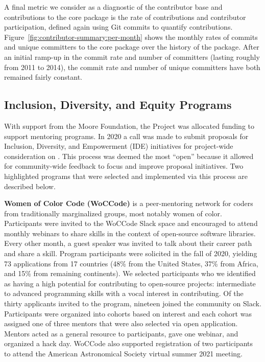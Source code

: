 \documentclass[modern]{aastex631}
\newcommand{\secauthor}[1]{{\color{blue}Author:~\textit{#1}}}
\begin{document}
A final metric we consider as a diagnostic of the contributor base and
contributions to the \astropypkg core package is the rate of contributions and
contributor participation, defined again using Git commits to quantify
contributions.
Figure~\ref{fig:contributor-summary:per-month} shows the monthly rates of
commits and unique committers to the \astropypkg core package over the history
of the package.
After an initial ramp-up in the commit rate and number of committers (lasting
roughly from 2011 to 2014), the commit rate and number of unique committers have
both remained fairly constant.


\subsection{Inclusion, Diversity, and Equity Programs} \label{sec:project-ide}


With support from the Moore Foundation, the \astropy Project was
allocated funding to support mentoring programs. In 2020 a call was
made to submit proposals for Inclusion, Diversity, and
Empowerment (IDE) initiatives for project-wide consideration on
\github. This process was deemed the most ``open'' because it allowed
for community-wide feedback to focus and improve proposal
initiatives. Two highlighted programs that were selected and implemented via
this process are described below.


\textbf{Women of Color Code (WoCCode)} is a peer-mentoring network for
coders from traditionally marginalized groups, most notably women of
color. Participants were invited to the WoCCode Slack space and
encouraged to attend monthly webinars to share skills in the context
of open-source software libraries. Every other month, a guest speaker
was invited to talk about their career path and share a skill. Program
participants were solicited in the fall of 2020, yielding 73
applications from 17 countries (48\% from the United States, 37\% from
Africa, and 15\% from remaining continents). We selected participants
who we identified as having a high potential for contributing to
open-source projects: intermediate to advanced programming skills with a
vocal interest in contributing. Of the thirty applicants invited to
the program, nineteen joined the community on Slack. Participants were
organized into cohorts based on interest and each cohort was assigned
one of three mentors that were also selected via open
application. Mentors acted as a general resource to participants, gave
one webinar, and organized a hack day. WoCCode also supported
registration of two participants to attend the American Astronomical
Society virtual summer 2021 meeting.
\end{document}
